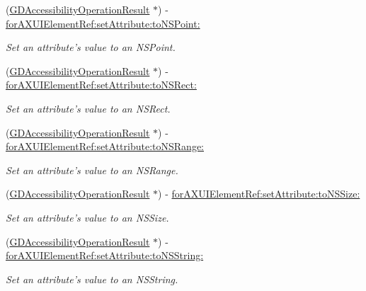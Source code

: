 \begin{DoxyCompactItemize}
(\hyperlink{interface_g_d_accessibility_operation_result}{GDAccessibilityOperationResult} $\ast$) -\/ \hyperlink{interface_g_d_accessibility_manager_aebd9e4bd904df0513641112d83df41d8}{forAXUIElementRef:setAttribute:toNSPoint:}
\begin{DoxyCompactList}\small\item\em Set an attribute's value to an NSPoint. \item\end{DoxyCompactList}\item 
(\hyperlink{interface_g_d_accessibility_operation_result}{GDAccessibilityOperationResult} $\ast$) -\/ \hyperlink{interface_g_d_accessibility_manager_acb7c3a3be1de6bdf614a08cc461f5c75}{forAXUIElementRef:setAttribute:toNSRect:}
\begin{DoxyCompactList}\small\item\em Set an attribute's value to an NSRect. \item\end{DoxyCompactList}\item 
(\hyperlink{interface_g_d_accessibility_operation_result}{GDAccessibilityOperationResult} $\ast$) -\/ \hyperlink{interface_g_d_accessibility_manager_acabbfd253bc37b73d799978bcabb37b4}{forAXUIElementRef:setAttribute:toNSRange:}
\begin{DoxyCompactList}\small\item\em Set an attribute's value to an NSRange. \item\end{DoxyCompactList}\item 
(\hyperlink{interface_g_d_accessibility_operation_result}{GDAccessibilityOperationResult} $\ast$) -\/ \hyperlink{interface_g_d_accessibility_manager_a9ebf98303317b2e55a27ca31bef44942}{forAXUIElementRef:setAttribute:toNSSize:}
\begin{DoxyCompactList}\small\item\em Set an attribute's value to an NSSize. \item\end{DoxyCompactList}\item 
(\hyperlink{interface_g_d_accessibility_operation_result}{GDAccessibilityOperationResult} $\ast$) -\/ \hyperlink{interface_g_d_accessibility_manager_a47b117c336fb6627353a74ab78cdd6a1}{forAXUIElementRef:setAttribute:toNSString:}
\begin{DoxyCompactList}\small\item\em Set an attribute's value to an NSString. \item\end{DoxyCompactList}\item 

\end{DoxyCompactItemize}
